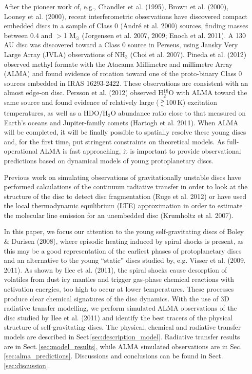 \documentclass[useAMS,usenatbib]{mn2e}
\begin{document}
After the pioneer work of, e.g., Chandler et al. (1995), Brown et al. (2000), Looney et al. (2000), recent interferometric observations have discovered compact embedded discs in a sample of Class 0 (Andr\'e et al. 2000) sources, finding masses between 0.4 and  $>$1 M$_{\odot}$ (Jorgensen et al. 2007, 2009; Enoch et al. 2011). A 130\,AU disc was discovered toward a Class 0 source in Perseus, using Jansky Very Large Array (JVLA) observations of NH$_3$ (Choi et al. 2007). Pineda et al. (2012) observed methyl formate with the Atacama Millimetre and millimetre Array (ALMA) and found evidence of rotation toward one of the proto-binary Class 0 sources embedded in IRAS 16293-2422. These observations are consistent with an almost edge-on disc. Persson et al. (2012) observed H$_2^{18}$O with ALMA toward the same source and found evidence of relatively large ($\ga$100\,K) excitation temperatures, as well as a HDO/H$_2$O abundance ratio close to that measured on Earth's oceans and Jupiter-family comets (Hartogh et al. 2011). When ALMA will be completed, it will be finally possible to spatially resolve these young discs and, for the first time, put stringent constraints on theoretical models. As full-operational ALMA is fast approaching, it is important to provide observational predictions based on dynamical models of young protoplanetary discs. 

Previous work on simulating observations of gravitationally unstable discs have performed calculations of the continuum radiative transfer in order to look at the structure of the disc to detect disc fragmentation (Ruge et al. 2012) or have used the local thermodynamic equilibrium (LTE) approximation in order to estimate the molecular line emission for an unembedded disc (Krumholtz et al. 2007). 

In this paper, we focus our attention to the young self-gravitating discs of Boley \& Durisen (2008), where episodic heating induced by spiral shocks is present, as this may be a good representation of the earliest phases of protoplanetary discs and an alternative to the young ``static'' discs studied by, e.g. Visser et al. (2009, 2011). As shown by Ilee et al. (2011), the spiral shocks cause desorption of volatiles from dust icy mantles and trigger gas-phase chemical reactions with activation energies, too high to occur at lower temperatures. These processes produce clear chemical signatures of the disc dynamics. With the use of 3D radiative transfer modelling, we perform simulated ALMA observations of the disc studied by Ilee et al. (2011) and identify the best tracers of the physical structure of self-gravitating discs. The physical, chemical and radiative transfer models are described in Sect\,\ref{sec:description_model}. Radiative transfer results are in Sect.\,\ref{sec:model_results}, while ALMA simulated observations are in Sec.\,\ref{sec:alma_predictions}. Discussions and conclusions can be found in Sect.\,\ref{sec:discussion}. 
\end{document}
